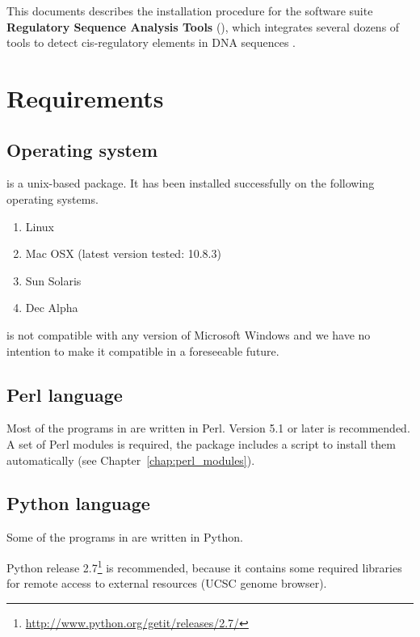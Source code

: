\documentclass[12pt,a4paper, oneside]{scrreprt} %
\begin{document}
This documents describes the installation procedure for the software
suite \textbf{Regulatory Sequence Analysis Tools} (\RSAT), which
integrates several dozens of tools to detect cis-regulatory elements
in DNA sequences
\cite{Thomas-Chollier:2011:W86-91,Thomas-Chollier:2008:W119-27,vanHelden:2003:3593-6,vanHelden:2000:177-87}.

\section{Requirements}

\subsection{Operating system}

\RSAT is a unix-based package. It has been installed successfully on
the following operating systems.

\begin{enumerate}
\item Linux

\item Mac OSX (latest version tested: 10.8.3)

\item Sun Solaris

\item Dec Alpha

\end{enumerate}

\RSAT is not compatible with any version of Microsoft Windows and we
have no intention to make it compatible in a foreseeable future.

\subsection{Perl language}

Most of the programs in \RSAT are written in Perl. Version 5.1 or
later is recommended. A set of Perl modules is required, the \RSAT
package includes a script to install them automatically (see
Chapter~\ref{chap:perl_modules}).

\subsection{Python language}

Some of the programs in \RSAT are written in Python. 

Python release
2.7\footnote{\url{http://www.python.org/getit/releases/2.7/}} is
recommended, because it contains some required libraries for remote
access to external resources (UCSC genome browser).
\end{document}
